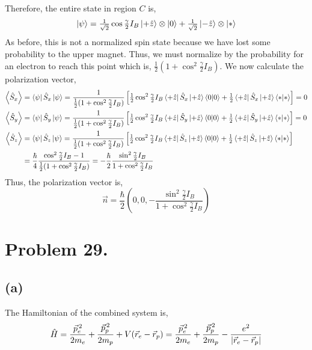 \documentclass[12pt]{extarticle}
\begin{document}
Therefore, the entire state in region $C$ is,
\[\left| \psi \right> = \tfrac{1}{\sqrt{2}} \cos{\tfrac{\gamma}{2} I_B} \left| +\hat{z} \right> \otimes \left| 0 \right> + \tfrac{1}{\sqrt{2}} \left| -\hat{z} \right> \otimes \left| * \right>\] 
As before, this is not a normalized spin state because we have lost some probability to the upper magnet. Thus, we must normalize by the probability for an electron to reach this point which is, $\frac{1}{2}(1 + \cos^2{\tfrac{\gamma}{2}I_B})$.     
We now calculate the polarization vector,
\begin{align*}
\left< \hat{S}_x \right> & = \left< \psi \right| \hat{S}_x \left| \psi \right> = \frac{1}{\frac{1}{2}(1 + \cos^2{\tfrac{\gamma}{2}I_B})} \left[ \tfrac{1}{2}\cos^2{\tfrac{\gamma}{2} I_B} \left< + \hat{z} \right| \hat{S}_x \left| +\hat{z} \right> \left< 0 | 0 \right> + \tfrac{1}{2} \left< + \hat{z} \right| \hat{S}_x \left| +\hat{z} \right> \left< * | * \right> \right] = 0\\
\left< \hat{S}_y \right> & = \left< \psi \right| \hat{S}_y \left| \psi \right> = \frac{1}{\frac{1}{2}(1 + \cos^2{\tfrac{\gamma}{2}I_B})} \left[ \tfrac{1}{2}\cos^2{\tfrac{\gamma}{2} I_B} \left< + \hat{z} \right| \hat{S}_y \left| +\hat{z} \right> \left< 0 | 0 \right> + \tfrac{1}{2} \left< + \hat{z} \right| \hat{S}_y \left| +\hat{z} \right> \left< * | * \right> \right] = 0\\
\left< \hat{S}_z \right> & = \left< \psi \right| \hat{S}_z \left| \psi \right> = \frac{1}{\frac{1}{2}(1 + \cos^2{\tfrac{\gamma}{2}I_B})} \left[ \tfrac{1}{2}\cos^2{\tfrac{\gamma}{2} I_B} \left< + \hat{z} \right| \hat{S}_z \left| +\hat{z} \right> \left< 0 | 0 \right> + \tfrac{1}{2} \left< + \hat{z} \right| \hat{S}_z \left| +\hat{z} \right> \left< * | * \right> \right] \\
& = \frac{\hbar}{4} \frac{\cos^2{\tfrac{\gamma}{2} I_B} - 1}{\frac{1}{2}(1 + \cos^2{\tfrac{\gamma}{2}I_B})} = -\frac{\hbar}{2} \frac{\sin^2{\tfrac{\gamma}{2} I_B}}{1 + \cos^2{\tfrac{\gamma}{2}I_B}}
\end{align*} 
Thus, the polarization vector is, 
\[\vec{n} = \frac{\hbar}{2} \left(0, 0, -\frac{\sin^2{\tfrac{\gamma}{2}I_B}}{1 + \cos^2{\tfrac{\gamma}{2}I_B}}\right)\] 
\section*{Problem 29.}

\subsection*{(a)}

The Hamiltonian of the combined system is,
\[\hat{H} = \frac{\vec{p}_e^{\, 2}}{2m_e} + \frac{\vec{p}_p^{\,2}}{2m_p} + V(\vec{r}_e - \vec{r}_p) = \frac{\vec{p}_e^{\, 2}}{2m_e} + \frac{\vec{p}_p^{\,2}}{2m_p} - \frac{e^2}{|\vec{r}_e - \vec{r}_p|}\]
\end{document}
